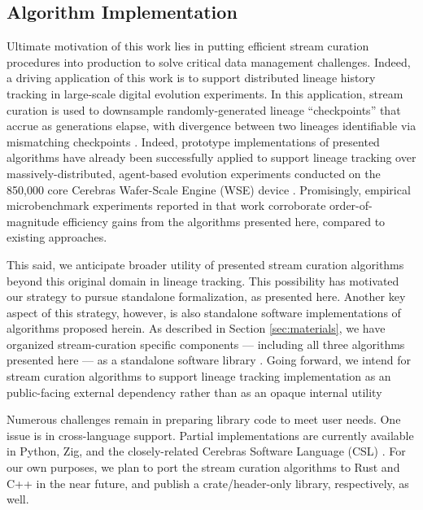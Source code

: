 \subsection{Algorithm Implementation}

Ultimate motivation of this work lies in putting efficient stream curation procedures into production to solve critical data management challenges.
Indeed, a driving application of this work is to support distributed lineage history tracking in large-scale digital evolution experiments.
In this application, stream curation is used to downsample randomly-generated lineage ``checkpoints'' that accrue as generations elapse, with divergence between two lineages identifiable via mismatching checkpoints \citep{moreno2022hereditary}.
Indeed, prototype implementations of presented algorithms have already been successfully applied to support lineage tracking over massively-distributed, agent-based evolution experiments conducted on the 850,000 core Cerebras Wafer-Scale Engine (WSE) device \citep{moreno2024trackable}.
Promisingly, empirical microbenchmark experiments reported in that work corroborate order-of-magnitude efficiency gains from the algorithms presented here, compared to existing approaches.

This said, we anticipate broader utility of presented stream curation algorithms beyond this original domain in lineage tracking.
This possibility has motivated our strategy to pursue standalone formalization, as presented here.
Another key aspect of this strategy, however, is also standalone software implementations of algorithms proposed herein.
As described in Section \ref{sec:materials}, we have organized stream-curation specific components --- including all three algorithms presented here --- as a standalone software library \citep{moreno2024downstream}.
Going forward, we intend for stream curation algorithms to support lineage tracking implementation as an public-facing external dependency rather than as an opaque internal utility \citep{moreno2022hstrat}

Numerous challenges remain in preparing library code to meet user needs.
One issue is in cross-language support.
Partial implementations are currently available in Python, Zig, and the closely-related Cerebras Software Language (CSL) \citep{moreno2024hsurf,moreno2024downstream,moreno2024wse}.
For our own purposes, we plan to port the stream curation algorithms to Rust and C++ in the near future, and publish a crate/header-only library, respectively, as well.


